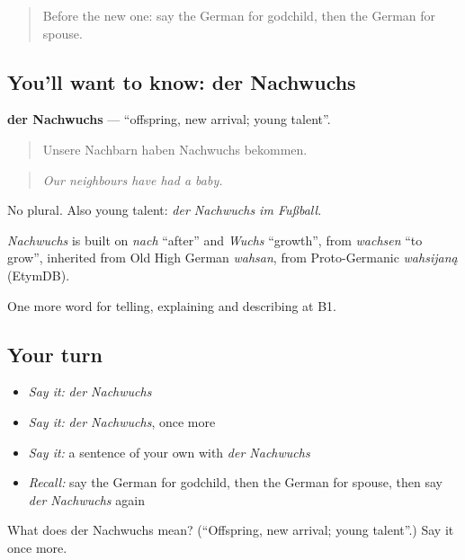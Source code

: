 \label{lesson:GE-C491-nachwuchs}



\begin{quote}
Before the new one: say the German for godchild, then the German for spouse.
\end{quote}

\subsection*{You'll want to know: der Nachwuchs}
\textbf{der Nachwuchs} — \textquotedblleft{}offspring, new arrival; young talent\textquotedblright{}.

\begin{quote}
Unsere Nachbarn haben Nachwuchs bekommen.
\end{quote}

\begin{quote}
\emph{Our neighbours have had a baby.}
\end{quote}

No plural. Also young talent: \emph{der Nachwuchs im Fußball}.

\begin{cousinweb}
\emph{Nachwuchs} is built on \emph{nach} \textquotedblleft{}after\textquotedblright{} and \emph{Wuchs} \textquotedblleft{}growth\textquotedblright{}, from \emph{wachsen} \textquotedblleft{}to grow\textquotedblright{}, inherited from Old High German \emph{wahsan}, from Proto-Germanic \emph{wahsijaną} (EtymDB).
\end{cousinweb}

\begin{grammarlens}[title={What you've built}]
One more word for telling, explaining and describing at B1.
\end{grammarlens}

\subsection*{Your turn}
\begin{itemize}
\raggedright
  \item \emph{Say it:} \emph{der Nachwuchs}
  \item \emph{Say it:} \emph{der Nachwuchs}, once more
  \item \emph{Say it:} a sentence of your own with \emph{der Nachwuchs}
  \item \emph{Recall:} say the German for godchild, then the German for spouse, then say \emph{der Nachwuchs} again
\end{itemize}

\begin{tcolorbox}[breakable,colback=teal!4,colframe=teal!35!black,title={Before you move on}]
What does der Nachwuchs mean? (\textquotedblleft{}Offspring, new arrival; young talent\textquotedblright{}.) Say it once more.
\end{tcolorbox}
